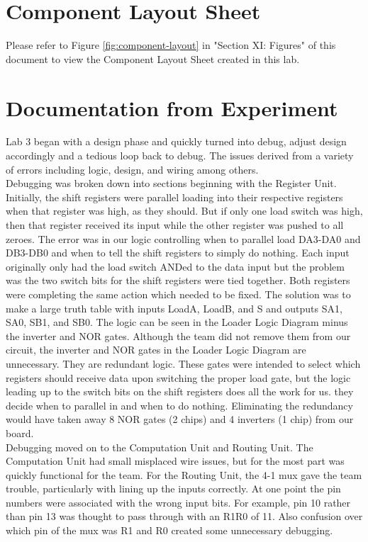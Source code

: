 \documentclass[journal, twocolumn, final,11pt,letterpaper]{IEEEtran}
\begin{document}
\section{Component Layout Sheet}
Please refer to Figure \ref{fig:component-layout} in "Section XI: Figures" of this document to view the Component Layout Sheet created in this lab.

\section{Documentation from Experiment}
Lab 3 began with a design phase and quickly turned into debug, adjust design accordingly and a tedious loop back to debug.  The issues derived from a variety of errors including logic, design, and wiring among others. \\

Debugging was broken down into sections beginning with the Register Unit.  Initially, the shift registers were parallel loading into their respective registers when that register was high, as they should. But if only one load switch was high, then that register received its input while the other register was pushed to all zeroes.  The error was in our logic controlling when to parallel load DA3-DA0 and DB3-DB0 and when to tell the shift registers to simply do nothing.  Each input originally only had the load switch ANDed to the data input but the problem was the two switch bits for the shift registers were tied together.  Both registers were completing the same action which needed to be fixed.  The solution was to make a large truth table with inputs LoadA, LoadB, and S and outputs SA1, SA0, SB1, and SB0.  The logic can be seen in the Loader Logic Diagram minus the inverter and NOR gates.  Although the team did not remove them from our circuit, the inverter and NOR gates in the Loader Logic Diagram are unnecessary.  They are redundant logic. These gates were intended to select which registers should receive data upon switching the proper load gate, but the logic leading up to the switch bits on the shift registers does all the work for us.  they decide when to parallel in and when to do nothing.  Eliminating the redundancy would have taken away 8 NOR gates (2 chips) and 4 inverters (1 chip) from our board.  \\

Debugging moved on to the Computation Unit and Routing Unit.  The Computation Unit had small misplaced wire issues, but for the most part was quickly functional for the team.  For the Routing Unit, the 4-1 mux gave the team trouble, particularly with lining up the inputs correctly.  At one point the pin numbers were associated with the wrong input bits.  For example, pin 10 rather than pin 13 was thought to pass through with an R1R0 of 11.  Also confusion over which pin of the mux was R1 and R0 created some unnecessary debugging.\\
\end{document}
